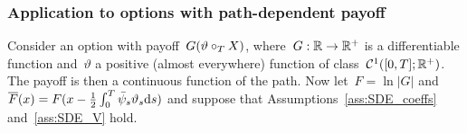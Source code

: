 
\subsubsection{\textbf{Application to options with path-dependent payoff}}
Consider an option with payoff~$G(\vartheta \circ_{T} X)$, where~$G:\mathbb{R} \rightarrow \mathbb{R}^{+}$ is a differentiable function and~$\vartheta$ a positive (almost everywhere) function of class~$\mathcal{C}^1([0,T]; \mathbb{R}^{+})$. 
The payoff is then a continuous function of the path. Now let~$F = \ln|G|$ and~${\overline{F}(x) = F(x-\frac{1}{2}\int_0^T\bar\psi_s\vartheta_s \mathrm{d} s)}$ and suppose that Assumptions~\ref{ass:SDE_coeffs} and~\ref{ass:SDE_V} hold.


